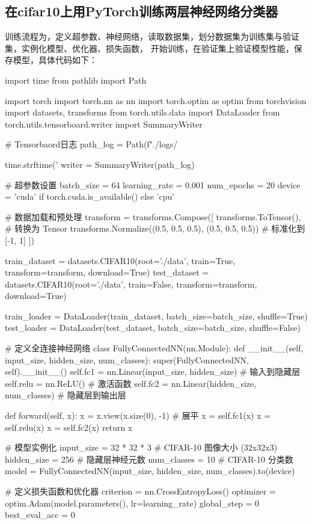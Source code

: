 \documentclass[12pt, a4paper, oneside]{ctexart}
\numberwithin{equation}{section}  %
\begin{document}
\subsection{在cifar10上用PyTorch训练两层神经网络分类器}
训练流程为，定义超参数、神经网络，读取数据集，划分数据集为训练集与验证集，实例化模型、优化器、损失函数，
开始训练，在验证集上验证模型性能，保存模型，具体代码如下：
\begin{pythoncode}
import time
from pathlib import Path

import torch
import torch.nn as nn
import torch.optim as optim
from torchvision import datasets, transforms
from torch.utils.data import DataLoader
from torch.utils.tensorboard.writer import SummaryWriter

# Tensorbaord日志
path_log = Path(f"./logs/{time.strftime('%
writer = SummaryWriter(path_log)

# 超参数设置
batch_size = 64
learning_rate = 0.001
num_epochs = 20
device = 'cuda' if torch.cuda.is_available() else 'cpu'

# 数据加载和预处理
transform = transforms.Compose([
  transforms.ToTensor(),        # 转换为 Tensor
  transforms.Normalize((0.5, 0.5, 0.5), (0.5, 0.5, 0.5))  # 标准化到 [-1, 1]
])

train_dataset = datasets.CIFAR10(root='./data', train=True, transform=transform, download=True)
test_dataset = datasets.CIFAR10(root='./data', train=False, transform=transform, download=True)

train_loader = DataLoader(train_dataset, batch_size=batch_size, shuffle=True)
test_loader = DataLoader(test_dataset, batch_size=batch_size, shuffle=False)

# 定义全连接神经网络
class FullyConnectedNN(nn.Module):
  def __init__(self, input_size, hidden_size, num_classes):
    super(FullyConnectedNN, self).__init__()
    self.fc1 = nn.Linear(input_size, hidden_size)  # 输入到隐藏层
    self.relu = nn.ReLU()             # 激活函数
    self.fc2 = nn.Linear(hidden_size, num_classes)  # 隐藏层到输出层

  def forward(self, x):
    x = x.view(x.size(0), -1)  # 展平
    x = self.fc1(x)
    x = self.relu(x)
    x = self.fc2(x)
    return x

# 模型实例化
input_size = 32 * 32 * 3  # CIFAR-10 图像大小 (32x32x3)
hidden_size = 256     # 隐藏层神经元数
num_classes = 10      # CIFAR-10 分类数
model = FullyConnectedNN(input_size, hidden_size, num_classes).to(device)

# 定义损失函数和优化器
criterion = nn.CrossEntropyLoss()
optimizer = optim.Adam(model.parameters(), lr=learning_rate)
global_step = 0
best_eval_acc = 0

}
\end{pythoncode}
\end{document}
